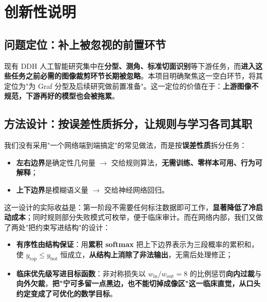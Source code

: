 \documentclass[UTF8,a4paper,10pt]{ctexart}
\begin{document}
\section{创新性说明}

\subsection{问题定位：补上被忽视的前置环节}

现有 DDH 人工智能研究集中在\textbf{分型、测角、标准切面识别}等下游任务\cite{bhavsar2025ddh}，而\textbf{进入这些任务之前必需的图像裁剪环节长期被忽略}。本项目明确聚焦这一空白环节，将其定位为"为 Graf 分型及后续研究做前置准备"。这一定位的价值在于：\textbf{上游图像不规范，下游再好的模型也会被拖累}。

\subsection{方法设计：按误差性质拆分，让规则与学习各司其职}

我们没有采用"一个网络端到端搞定"的常见做法，而是按\textbf{误差性质}拆分任务：

\begin{itemize}[leftmargin=1.6em,itemsep=1.5pt,topsep=2pt]
\item \textbf{左右边界}是确定性几何量 $\rightarrow$ 交给规则算法，\textbf{无需训练、零样本可用、行为可解释}；
\item \textbf{上下边界}是模糊语义量 $\rightarrow$ 交给神经网络回归。
\end{itemize}

\noindent 这一设计的实际收益是：第一阶段不需要任何标注数据即可工作，\textbf{显著降低了冷启动成本}；同时规则部分失败模式可枚举，便于临床审计。而在网络内部，我们又做了两处"把约束写进结构"的设计：

\begin{itemize}[leftmargin=1.6em,itemsep=1.5pt,topsep=2pt]
\item \textbf{有序性由结构保证}：用\textbf{累积 softmax} 把上下边界表示为三段概率的累积和，使 $y_{\text{top}} \leq y_{\text{bot}}$ 恒成立，\textbf{从结构上消除了非法输出}，无需后处理修正；
\item \textbf{临床优先级写进目标函数}：非对称损失以 $w_{\text{in}}/w_{\text{out}} = 8$ 的比例惩罚\textbf{向内过裁}与\textbf{向外欠裁}，\textbf{把"宁可多留一点黑边，也不能切掉成像区"这一临床直觉，从口头约定变成了可优化的数学目标}。
\end{itemize}
\end{document}
